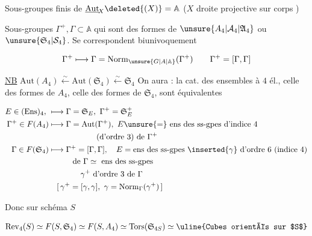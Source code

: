 
Sous-groupes finis de  $\underline{\mathrm{Aut}}_{\!X}\deleted{(X)}=\mathbb A$ ($X$ droite projective sur corps  )

 Sous-groupes $\Gamma^{+},\Gamma\subset\mathbb A$ qui sont des formes de $\unsure{A_4|\mathcal A_4|\mathfrak A_4}$ ou $\unsure{\mathfrak S_4|\mathcal S_4}$. Se correspondent biunivoquement

\[
\Gamma^{+}\longmapsto\Gamma=\mathrm{Norm}_{\unsure{G|A|\mathbb A}}(\Gamma^{+})\qquad
\Gamma^{+}=[\Gamma,\Gamma]
\]

\uline{NB} $\mathrm{Aut}(A_4)\xleftarrow{\sim}\mathrm{Aut}(\mathfrak S_4)\xleftarrow{\sim}\mathfrak S_4$ On aura : la cat. des ensembles à $4$ él., celle des formes de $A_4$, celle des formes de $\mathfrak S_4$, sont équivalentes


\[
\begin{aligned}
E\in(\mathrm{Ens})_4,\ &\longmapsto\Gamma=\mathfrak S_E,\ \Gamma^{+}=\mathfrak S_E^{+}\\
\Gamma^{+}\in F(A_4)&\longmapsto\Gamma=\mathrm{Aut}(\Gamma^{+}),\ \text{$E\unsure{=}$ ens des ss-gpes d'indice $4$}\\
&\hspace{6em}\text{(d'ordre $3$) de $\Gamma^{+}$}\\
\Gamma\in F(\mathfrak S_4)&\longmapsto\Gamma^{+}=[\Gamma,\Gamma],\quad E=\text{ens des ss-gpes $\inserted{\gamma}$ d'ordre $6$ (indice $4$)}\\
&\hspace{3em}\text{de $\Gamma$}\simeq\text{ ens des ss-gpes}\\
&\hspace{4em}\gamma^{+}\text{ d'ordre $3$ de $\Gamma$}\\
&\quad[\,\gamma^{+}=[\gamma,\gamma],\ \gamma=\mathrm{Norm}_{\Gamma}(\gamma^{+})\,]
\end{aligned}
\]

Donc sur schéma $S$

\[
\mathrm{Rev}_4(S)\simeq F(S,\mathfrak S_4)\simeq F(S,A_4)
\simeq\mathrm{Tors}(\mathfrak S_{4S})\simeq\text{\uline{Cubes orientés sur $S$}}
\]

